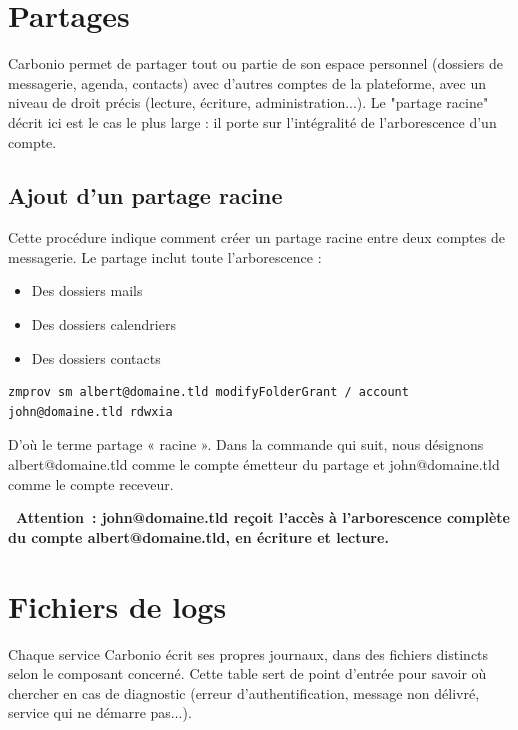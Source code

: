 \documentclass[11pt,a4paper]{report}
\newcommand{\dnswarning}[1]{\textbf{\textcolor{placeholdercol}{\textbullet\ Attention~: #1}}\par\vspace{4pt}}
\begin{document}
\chapter{Partages}

Carbonio permet de partager tout ou partie de son espace personnel
(dossiers de messagerie, agenda, contacts) avec d'autres comptes de la
plateforme, avec un niveau de droit précis (lecture, écriture,
administration.\allowbreak{}.\allowbreak{}.\allowbreak{}).\allowbreak{} Le "partage racine" décrit ici est le cas le plus
large : il porte sur l'intégralité de l'arborescence d'un compte.\allowbreak{}


\section{Ajout d'un partage racine}
Cette procédure indique comment créer un partage racine entre deux comptes de
messagerie.\allowbreak{} Le partage inclut toute l'arborescence :


\begin{itemize}[nosep]
  \item Des dossiers mails
  \item Des dossiers calendriers
  \item Des dossiers contacts
\end{itemize}

\begin{lstlisting}
zmprov sm albert@domaine.tld modifyFolderGrant / account john@domaine.tld rdwxia
\end{lstlisting}
D'où le terme partage « racine ».\allowbreak{} Dans la commande qui suit, nous désignons
albert@domaine.\allowbreak{}tld comme le compte émetteur du partage et john@domaine.\allowbreak{}tld comme
le compte receveur.\allowbreak{}


\dnswarning{john@domaine.\allowbreak{}tld reçoit l'accès à l'arborescence complète du compte albert@domaine.\allowbreak{}tld, en écriture et lecture.\allowbreak{}}


\chapter{Fichiers de logs}

Chaque service Carbonio écrit ses propres journaux, dans des fichiers
distincts selon le composant concerné.\allowbreak{} Cette table sert de point
d'entrée pour savoir où chercher en cas de diagnostic (erreur
d'authentification, message non délivré, service qui ne démarre pas.\allowbreak{}.\allowbreak{}.\allowbreak{}).\allowbreak{}
\end{document}
